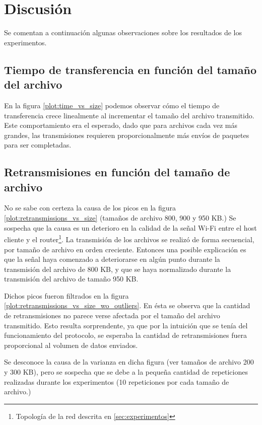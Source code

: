 \documentclass[a4paper, 10pt, twoside]{article}
\begin{document}
\section{Discusión}
\label{sec:discusion}

Se comentan a continuación algunas observaciones sobre los resultados de los experimentos.


\subsection{Tiempo de transferencia en función del tamaño del archivo}

En la figura \ref{plot:time_vs_size} podemos observar cómo el tiempo de transferencia crece linealmente al incrementar el tamaño del archivo transmitido. Este comportamiento era el esperado, dado que para archivos cada vez más grandes, las transmisiones requieren proporcionalmente más envíos de paquetes para ser completadas.


\subsection{Retransmisiones en función del tamaño de archivo}
\label{sec:discusion-retransmisiones-vs-tam}

No se sabe con certeza la causa de los picos en la figura \ref{plot:retransmissions_vs_size} (tamaños de archivo 800, 900 y 950 KB.) Se sospecha que la causa es un deterioro en la calidad de la señal Wi-Fi entre el host cliente y el router\footnote{Topología de la red descrita en \ref{sec:experimentos}}. La transmisión de los archivos se realizó de forma secuencial, por tamaño de archivo en orden creciente. Entonces una posible explicación es que la señal haya comenzado a deteriorarse en algún punto durante la transmisión del archivo de 800 KB, y que se haya normalizado durante la transmisión del archivo de tamaño 950 KB.

Dichos picos fueron filtrados en la figura \ref{plot:retransmissions_vs_size_wo_outliers}. En ésta se observa que la cantidad de retransmisiones no parece verse afectada por el tamaño del archivo transmitido. Esto resulta sorprendente, ya que por la intuición que se tenía del funcionamiento del protocolo, se esperaba la cantidad de retransmisiones fuera proporcional al volumen de datos enviados.

Se desconoce la causa de la varianza en dicha figura (ver tamaños de archivo 200 y 300 KB), pero se sospecha que se debe a la pequeña cantidad de repeticiones realizadas durante los experimentos (10 repeticiones por cada tamaño de archivo.)
\end{document}
